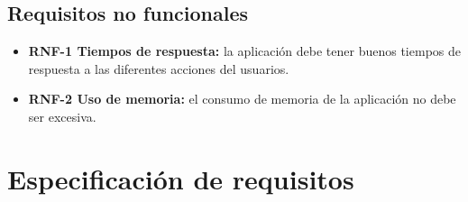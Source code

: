 \subsection{Requisitos no funcionales}

\begin{itemize}
	\item \textbf{RNF-1 Tiempos de respuesta:} la aplicación debe tener buenos tiempos de respuesta a las diferentes acciones del usuarios. 
	\item \textbf{RNF-2 Uso de memoria:} el consumo de memoria de la aplicación no debe ser excesiva.
\end{itemize}


\section{Especificación de requisitos}



